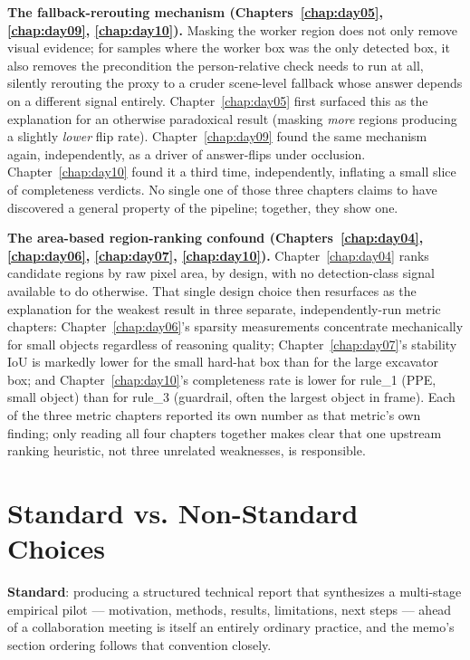 \textbf{The fallback-rerouting mechanism (Chapters~\ref{chap:day05}, \ref{chap:day09},
\ref{chap:day10}).} Masking the worker region does not only remove visual evidence; for
samples where the worker box was the only detected box, it also removes the precondition the
person-relative check needs to run at all, silently rerouting the proxy to a cruder scene-level
fallback whose answer depends on a different signal entirely. Chapter~\ref{chap:day05} first
surfaced this as the explanation for an otherwise paradoxical result (masking \emph{more}
regions producing a slightly \emph{lower} flip rate). Chapter~\ref{chap:day09} found the same
mechanism again, independently, as a driver of answer-flips under occlusion. Chapter~\ref{chap:day10}
found it a third time, independently, inflating a small slice of completeness verdicts. No
single one of those three chapters claims to have discovered a general property of the
pipeline; together, they show one.

\textbf{The area-based region-ranking confound (Chapters~\ref{chap:day04}, \ref{chap:day06},
\ref{chap:day07}, \ref{chap:day10}).} Chapter~\ref{chap:day04} ranks candidate regions by raw
pixel area, by design, with no detection-class signal available to do otherwise. That single
design choice then resurfaces as the explanation for the weakest result in three separate,
independently-run metric chapters: Chapter~\ref{chap:day06}'s sparsity measurements concentrate
mechanically for small objects regardless of reasoning quality; Chapter~\ref{chap:day07}'s
stability IoU is markedly lower for the small hard-hat box than for the large excavator box;
and Chapter~\ref{chap:day10}'s completeness rate is lower for rule\_1 (PPE, small object) than
for rule\_3 (guardrail, often the largest object in frame). Each of the three metric chapters
reported its own number as that metric's own finding; only reading all four chapters together
makes clear that one upstream ranking heuristic, not three unrelated weaknesses, is responsible.

\section{Standard vs. Non-Standard Choices}

\textbf{Standard}: producing a structured technical report that synthesizes a multi-stage
empirical pilot --- motivation, methods, results, limitations, next steps --- ahead of a
collaboration meeting is itself an entirely ordinary practice, and the memo's section ordering
follows that convention closely.

